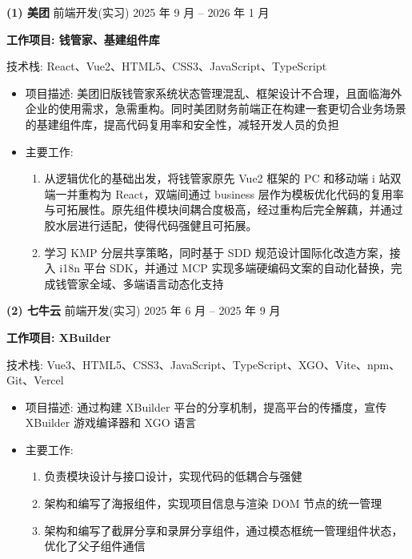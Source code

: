\documentclass[11pt,a4paper]{extarticle}
\begin{document}
\textbf{(1) 美团} \quad 前端开发(实习) \hfill 2025 年 9 月 -- 2026 年 1 月

\textbf{工作项目: 钱管家、基建组件库}

技术栈: React、Vue2、HTML5、CSS3、JavaScript、TypeScript

\begin{itemize}
  \item 项目描述: 美团旧版钱管家系统状态管理混乱、框架设计不合理，且面临海外企业的使用需求，急需重构。同时美团财务前端正在构建一套更切合业务场景的基建组件库，提高代码复用率和安全性，减轻开发人员的负担
  \item 主要工作:
  \begin{enumerate}
    \item 从逻辑优化的基础出发，将钱管家原先 Vue2 框架的 PC 和移动端 i 站双端一并重构为 React，双端间通过 business 层作为模板优化代码的复用率与可拓展性。原先组件模块间耦合度极高，经过重构后完全解藕，并通过胶水层进行适配，使得代码强健且可拓展。
    \item 学习 KMP 分层共享策略，同时基于 SDD 规范设计国际化改造方案，接入 i18n 平台 SDK，并通过 MCP 实现多端硬编码文案的自动化替换，完成钱管家全域、多端语言动态化支持
  \end{enumerate}
\end{itemize}

\textbf{(2) 七牛云} \quad 前端开发(实习) \hfill 2025 年 6 月 -- 2025 年 9 月

\textbf{工作项目: XBuilder}

技术栈: Vue3、HTML5、CSS3、JavaScript、TypeScript、XGO、Vite、npm、Git、Vercel

\begin{itemize}
  \item 项目描述: 通过构建 XBuilder 平台的分享机制，提高平台的传播度，宣传 XBuilder 游戏编译器和 XGO 语言
  \item 主要工作:
  \begin{enumerate}
    \item 负责模块设计与接口设计，实现代码的低耦合与强健
    \item 架构和编写了海报组件，实现项目信息与渲染 DOM 节点的统一管理
    \item 架构和编写了截屏分享和录屏分享组件，通过模态框统一管理组件状态，优化了父子组件通信
  \end{enumerate}
\end{itemize}
\end{document}
